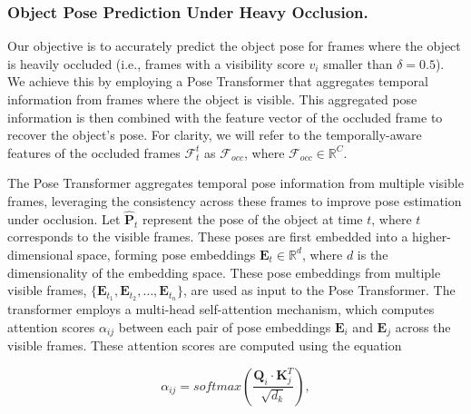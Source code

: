 \subsubsection{Object Pose Prediction Under Heavy Occlusion.}

Our objective is to accurately predict the object pose for frames where the object is heavily occluded (i.e., frames with a visibility score \( v_i \) smaller than \( \delta = 0.5 \)). We achieve this by employing a Pose Transformer that aggregates temporal information from frames where the object is visible. This aggregated pose information is then combined with the feature vector of the occluded frame to recover the object's pose. For clarity, we will refer to the temporally-aware features of the occluded frames \( \mathcal{F}_t^t \) as \( \mathcal{F}_{occ} \), where \( \mathcal{F}_{occ} \in \mathbb{R}^C \).

\noindent The Pose Transformer aggregates temporal pose information from multiple visible frames, leveraging the consistency across these frames to improve pose estimation under occlusion. Let \(\hat{\mathbf{P}}_t \) represent the pose of the object at time \( t \), where \( t \) corresponds to the visible frames. These poses are first embedded into a higher-dimensional space, forming pose embeddings \( \mathbf{E}_t \in \mathbb{R}^d \), where \( d \) is the dimensionality of the embedding space. These pose embeddings from multiple visible frames, \( \{\mathbf{E}_{t_1}, \mathbf{E}_{t_2}, \dots, \mathbf{E}_{t_n}\} \), are used as input to the Pose Transformer. The transformer employs a multi-head self-attention mechanism, which computes attention scores \( \alpha_{ij} \) between each pair of pose embeddings \( \mathbf{E}_i \) and \( \mathbf{E}_j \) across the visible frames. These attention scores are computed using the equation

\begin{equation}
    \alpha_{ij} = softmax\left(\frac{\mathbf{Q}_i \cdot \mathbf{K}_j^T}{\sqrt{d_k}}\right),
\end{equation}

